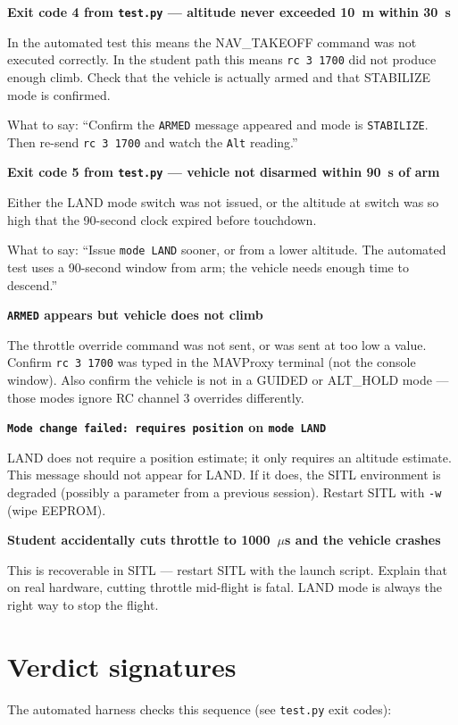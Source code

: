 \documentclass[a4paper,11pt,twoside]{article}
\begin{document}
\textbf{Exit code 4 from \texttt{test.py} --- altitude never exceeded 10~m within 30~s}

In the automated test this means the NAV\_TAKEOFF command was not executed correctly. In the student path this means \texttt{rc 3 1700} did not produce enough climb. Check that the vehicle is actually armed and that STABILIZE mode is confirmed.

What to say: ``Confirm the \texttt{ARMED} message appeared and mode is \texttt{STABILIZE}. Then re-send \texttt{rc 3 1700} and watch the \texttt{Alt} reading.''

\textbf{Exit code 5 from \texttt{test.py} --- vehicle not disarmed within 90~s of arm}

Either the LAND mode switch was not issued, or the altitude at switch was so high that the 90-second clock expired before touchdown.

What to say: ``Issue \texttt{mode LAND} sooner, or from a lower altitude. The automated test uses a 90-second window from arm; the vehicle needs enough time to descend.''

\textbf{\texttt{ARMED} appears but vehicle does not climb}

The throttle override command was not sent, or was sent at too low a value. Confirm \texttt{rc 3 1700} was typed in the MAVProxy terminal (not the console window). Also confirm the vehicle is not in a GUIDED or ALT\_HOLD mode --- those modes ignore RC channel 3 overrides differently.

\textbf{\texttt{Mode change failed: requires position} on \texttt{mode LAND}}

LAND does not require a position estimate; it only requires an altitude estimate. This message should not appear for LAND. If it does, the SITL environment is degraded (possibly a parameter from a previous session). Restart SITL with \texttt{-w} (wipe EEPROM).

\textbf{Student accidentally cuts throttle to 1000~$\mu$s and the vehicle crashes}

This is recoverable in SITL --- restart SITL with the launch script. Explain that on real hardware, cutting throttle mid-flight is fatal. LAND mode is always the right way to stop the flight.

\section*{Verdict signatures}

The automated harness checks this sequence (see \texttt{test.py} exit codes):
\end{document}
